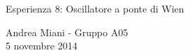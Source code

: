 \documentclass[11pt, twoside, a4paper]{article}
\begin{document}
  \begin{center}
  
    {\huge Esperienza 8: Oscillatore a ponte di Wien}
    
    \vspace{0.1cm}
    
    {Andrea Miani - Gruppo A05} \\
    {5 novembre 2014}
    
    \vspace{-0.1cm}
    
  \end{center}
  
  
  
  
  
\end{document}

